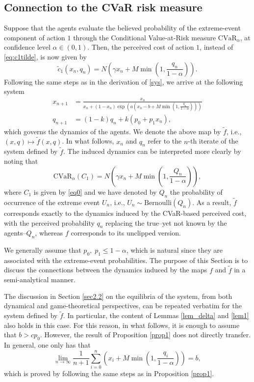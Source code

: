 \documentclass{article}
\theoremstyle{plain}
\theoremstyle{definition}
\begin{document}
\subsection{Connection to the CVaR risk measure}\label{sec2_app}
Suppose that the agents evaluate the believed probability of the extreme-event component of action \(1\) through the Conditional Value-at-Risk measure \(\mathrm{CVaR}_\alpha\), at confidence level \(\alpha\in(0,1)\). Then, the perceived cost of action \(1\), instead of \eqref{eq:c1tilde}, is now given by
\[\tilde c_1(x_n,q_n)
=
N\left(\gamma x_n+M\min\left(1,\frac{q_n}{1-\alpha}\right)\right).
\]
Following the same steps as in the derivation of \eqref{sys}, we arrive at the following system
\begin{align*}
x_{n+1}&=\frac{x_n}{x_n+(1-x_n)\exp\!\left(
a\left(x_n-b+M\min\!\left(1,\frac{q_n}{1-\alpha}\right)\right)
\right)} \nonumber\\
q_{n+1}&=(1-k)q_n+k(p_0+p_1x_n),
\end{align*}
which governs the dynamics of the agents. We denote the above map by $\tilde f$, i.e., $(x,q)\mapsto\tilde f(x,q)$. In what follows, $x_n$ and $q_n$ refer to the $n$-th iterate of the system defined by $\tilde f$. The induced dynamics can be interpreted more clearly by noting that
\[
\mathrm{CVaR}_\alpha(C_1)=N\left(\gamma x_n+M\min\left(1,\frac{Q_n}{1-\alpha}\right)\right),
\]
where $C_1$ is given by \eqref{eq0} and we have denoted by $Q_n$ the probability of occurrence of the extreme event $U_n$, i.e., $U_n \sim \mathrm{Bernoulli}(Q_n)$. As a result, $\tilde f$ corresponds exactly to the dynamics induced by the CVaR-based perceived cost, with the perceived probability $q_n$ replacing the true--yet not known by the agents--$Q_n$, whereas $f$ corresponds to its unclipped version. 



We generally assume that $p_0, \; p_1\leq 1-\alpha$, which is natural since they are associated with the extreme-event probabilities. The purpose of this Section is to discuss the connections between the dynamics induced by the maps $f$ and $\tilde f$ in a semi-analytical manner.

The discussion in Section \ref{sec2.2} on the equilibria of the system, from both dynamical and game-theoretical perspectives, can be repeated verbatim for the system defined by $\tilde f$. In particular, the content of Lemmas \ref{lem_delta} and \ref{lem1} also holds in this case. For this reason, in what follows, it is enough to assume that $b>cp_0.$ However, the result of Proposition \ref{prop1} does not directly transfer. In general, one only has that
\[
\lim_{n \to \infty} \frac{1}{n+1} \sum_{i=0}^n \left(x_i+M\min \left(1, \frac{q_i}{1-\alpha} \right) \right)=b,
\]
which is proved by following the same steps as in Proposition \ref{prop1}. 
\end{document}
